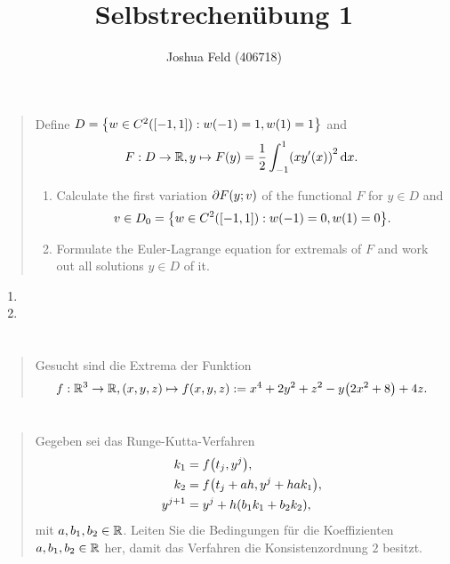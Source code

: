 \documentclass{exercise}
\title{Selbstrechenübung 1}
\author{Joshua Feld (406718)}
\begin{document}
	\maketitle


	\section{}

	\begin{quote}
		Define \(D = \braces*{w \in C^2\parentheses*{\brackets*{-1, 1}} : w\parentheses*{-1} = 1, w\parentheses*{1} = 1}\) and
		\[
			F: D \to \R, y \mapsto F\parentheses*{y} = \frac{1}{2}\int_{-1}^1 \parentheses*{xy'\parentheses*{x}}^2 \d x.
		\]
		\begin{enumerate}
			\item Calculate the first variation \(\partial F\parentheses*{y; v}\) of the functional \(F\) for \(y \in D\) and
			\[
				v \in D_0 = \braces*{w \in C^2\parentheses*{\brackets*{-1, 1}} : w\parentheses*{-1} = 0, w\parentheses*{1} = 0}.
			\]
			\item Formulate the Euler-Lagrange equation for extremals of \(F\) and work out all solutions \(y \in D\) of it.
		\end{enumerate}
	\end{quote}

	\begin{enumerate}
		\item
		\item
	\end{enumerate}


	\section{}

	\begin{quote}
		Gesucht sind die Extrema der Funktion
		\[
			f: \R^3 \to \R, \parentheses*{x, y, z} \mapsto f\parentheses*{x, y, z} := x^4 + 2y^2 + z^2 - y\parentheses*{2x^2 + 8} + 4z.
		\]
	\end{quote}


	\section{}

	\begin{quote}
		Gegeben sei das Runge-Kutta-Verfahren
		\begin{align*}
			k_1 &= f\parentheses*{t_j, y^j},\\
			k_2 &= f\parentheses*{t_j + ah, y^j + hak_1},\\
			y^{j + 1} &= y^j + h\parentheses*{b_1 k_1 + b_2 k_2},
		\end{align*}
		mit \(a, b_1, b_2 \in \mathbb{R}\).
		Leiten Sie die Bedingungen für die Koeffizienten \(a, b_1, b_2 \in \mathbb{R}\) her, damit das Verfahren die Konsistenzordnung \(2\) besitzt.
	\end{quote}
\end{document}
